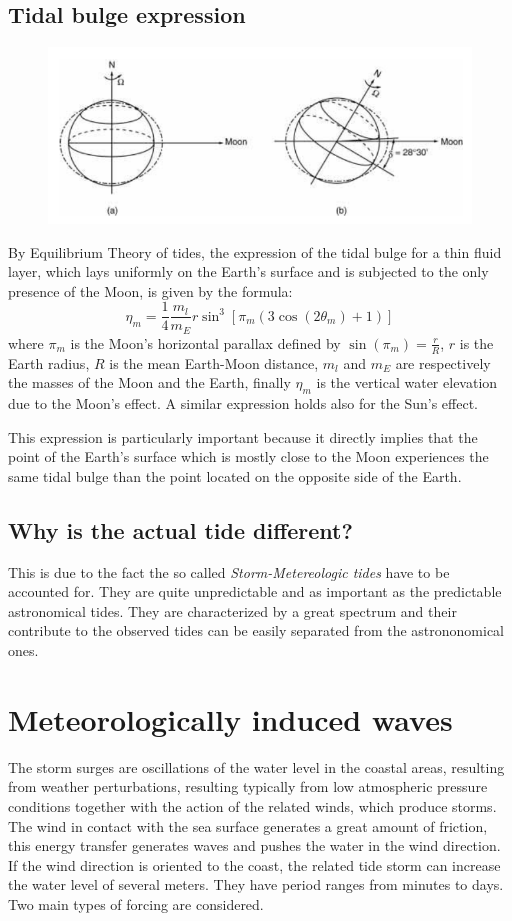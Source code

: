 \subsection{Tidal bulge expression}
\begin{figure}[t]
\centering
  \includegraphics[scale=0.55]{./SurfWaves_figs/declination.png}
\end{figure}
By Equilibrium Theory of tides, the expression of the tidal bulge for a thin fluid layer, which lays uniformly on the Earth's surface and is subjected to the only presence of the Moon, is given by the formula:
\[
\eta_m = \frac 1 4 \frac {m_l} {m_E} r \sin^3[\pi_m (3 \cos(2 \theta_m) + 1)]
\]
where $\pi_m$ is the Moon's horizontal parallax defined by $\sin(\pi_m) = \frac r R $, $r$ is the Earth radius, $R$ is the mean Earth-Moon distance, $m_l$ and $m_E$ are respectively the masses of the Moon and the Earth, finally $\eta_m $ is the vertical water elevation due to the Moon's effect. A similar expression holds also for the Sun's effect. 

This expression is particularly important because it directly implies that the point of the Earth's surface which is mostly close to the Moon experiences the same tidal bulge than the point located on the opposite side of the Earth. 

\subsection{Why is the actual tide different?}
This is due to the fact the so called \textit{Storm-Metereologic tides} have to be accounted for. They are quite unpredictable and as important as the predictable astronomical tides.  They are characterized by a great spectrum and their contribute to the observed tides can be easily separated from the astrononomical ones.


\section{Meteorologically induced waves}\label{meteo}
The storm surges are oscillations of the water level in the coastal areas, resulting from weather perturbations, resulting typically from low atmospheric pressure conditions together with the action of the related winds, which produce storms. The wind in contact with the sea surface generates a great amount of friction, this energy transfer generates waves and pushes the water in the wind direction. If the wind direction is oriented to the coast, the related tide storm can increase the water level of several meters. They have period ranges from minutes to days. Two main types of forcing are considered.

